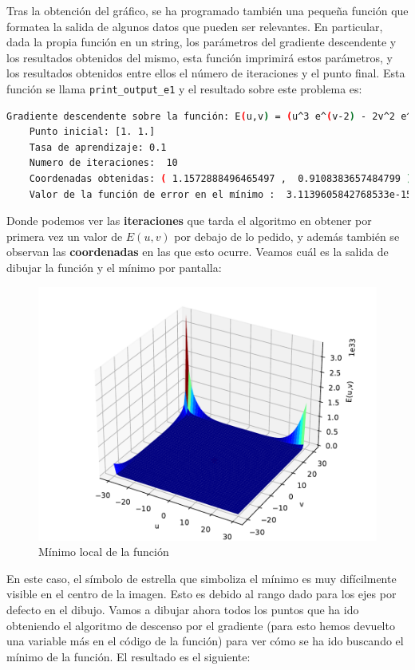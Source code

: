 \documentclass[12pt]{scrartcl}
\begin{document}
{Tras la obtención del gráfico, se ha programado también una pequeña función que formatea la salida de algunos datos que pueden ser relevantes.
En particular, dada la propia función en un string, los parámetros del gradiente descendente y los resultados obtenidos del mismo,
esta función imprimirá estos parámetros, y los resultados obtenidos entre ellos el número de iteraciones y el punto final. Esta función se llama \lstinline{print_output_e1}
y el resultado sobre este problema es:

\begin{lstlisting}[language=bash]
    Gradiente descendente sobre la función: E(u,v) = (u^3 e^(v-2) - 2v^2 e^(-u))^2
    Punto inicial: [1. 1.]
    Tasa de aprendizaje: 0.1
    Numero de iteraciones:  10
    Coordenadas obtenidas: ( 1.1572888496465497 ,  0.9108383657484799 )
    Valor de la función de error en el mínimo :  3.1139605842768533e-15
\end{lstlisting}

Donde podemos ver las \textbf{iteraciones} que tarda el algoritmo en obtener por primera vez un valor de $E(u,v)$ por debajo de lo pedido, y además también
se observan las \textbf{coordenadas} en las que esto ocurre. Veamos cuál es la salida de dibujar la función y el mínimo por pantalla:

\begin{figure}[H]
  \centering
  \includegraphics[scale=0.6]{media/E1-1.pdf}
  \caption{Mínimo local de la función}
\end{figure}

En este caso, el símbolo de estrella que simboliza el mínimo es muy difícilmente visible en el centro de la imagen. Esto es debido al rango dado para los ejes por defecto en el dibujo.
Vamos a dibujar ahora todos los puntos que ha ido obteniendo el algoritmo de descenso por el gradiente (para esto hemos devuelto una variable más en el código de la función) para ver cómo se ha ido buscando 
el mínimo de la función. El resultado es el siguiente:

}
\end{document}
